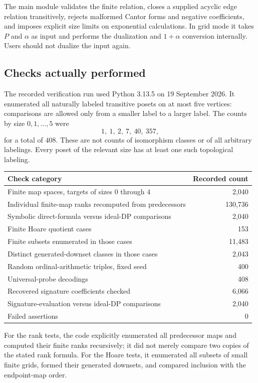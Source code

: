 \documentclass[11pt,a4paper]{article}
\theoremstyle{definition}
\theoremstyle{remark}
\begin{document}
The main module validates the finite relation, closes a supplied acyclic
edge relation transitively, rejects malformed Cantor forms and negative
coefficients, and imposes explicit size limits on exponential calculations.
In grid mode it takes $P$ and $\alpha$ as input and performs the dualization
and $1+\alpha$ conversion internally. Users should not dualize the input
again.

\subsection{Checks actually performed}
The recorded verification run used Python 3.13.5 on 19 September 2026.
It enumerated all naturally labeled transitive posets on at most five
vertices: comparisons are allowed only from a smaller label to a larger
label. The counts by size $0,1,\ldots,5$ were
\[
 1,\ 1,\ 2,\ 7,\ 40,\ 357,
\]
for a total of $408$. These are not counts of isomorphism classes or of
all arbitrary labelings. Every poset of the relevant size has at least one
such topological labeling.

\begin{center}
\begin{tabular}{@{}lr@{}}
\toprule
Check category & Recorded count\\
\midrule
Finite map spaces, targets of sizes $0$ through $4$ & 2,040\\
Individual finite-map ranks recomputed from predecessors & 130,736\\
Symbolic direct-formula versus ideal-DP comparisons & 2,040\\
Finite Hoare quotient cases & 153\\
Finite subsets enumerated in those cases & 11,483\\
Distinct generated-downset classes in those cases & 2,043\\
Random ordinal-arithmetic triples, fixed seed & 400\\
Universal-probe decodings & 408\\
Recovered signature coefficients checked & 6,066\\
Signature-evaluation versus ideal-DP comparisons & 2,040\\
Failed assertions & 0\\
\bottomrule
\end{tabular}
\end{center}

For the rank tests, the code explicitly enumerated all predecessor maps
and computed their finite ranks recursively; it did not merely compare
two copies of the stated rank formula. For the Hoare tests, it enumerated
all subsets of small finite grids, formed their generated downsets, and
compared inclusion with the endpoint-map order.
\end{document}

